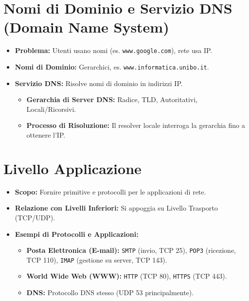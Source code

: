 \documentclass{article}
\begin{document}
\section{Nomi di Dominio e Servizio DNS (Domain Name System)}
\begin{itemize}
    \item \textbf{Problema:} Utenti usano nomi (es. \texttt{www.google.com}), rete usa IP.
    \item \textbf{Nomi di Dominio:} Gerarchici, es. \texttt{www.informatica.unibo.it}.
    \item \textbf{Servizio DNS:} Risolve nomi di dominio in indirizzi IP.
    \begin{itemize}
        \item \textbf{Gerarchia di Server DNS:} Radice, TLD, Autoritativi, Locali/Ricorsivi.
        \item \textbf{Processo di Risoluzione:} Il resolver locale interroga la gerarchia fino a ottenere l'IP.
    \end{itemize}
\end{itemize}

\section{Livello Applicazione}
\begin{itemize}
    \item \textbf{Scopo:} Fornire primitive e protocolli per le applicazioni di rete.
    \item \textbf{Relazione con Livelli Inferiori:} Si appoggia su Livello Trasporto (TCP/UDP).
    \item \textbf{Esempi di Protocolli e Applicazioni:}
    \begin{itemize}
        \item \textbf{Posta Elettronica (E-mail):} \texttt{SMTP} (invio, TCP 25), \texttt{POP3} (ricezione, TCP 110), \texttt{IMAP} (gestione su server, TCP 143).
        \item \textbf{World Wide Web (WWW):} \texttt{HTTP} (TCP 80), \texttt{HTTPS} (TCP 443).
        \item \textbf{DNS:} Protocollo DNS stesso (UDP 53 principalmente).
    \end{itemize}
\end{itemize}
\end{document}
